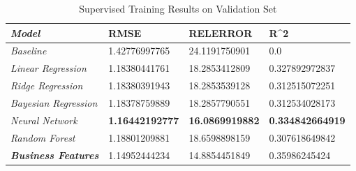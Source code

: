 \documentclass[letterpaper, 10 pt, conference]{ieeeconf}  %
\begin{document}

{\renewcommand{\arraystretch}{2}%
\begin{table}[t]
\centering
\caption{Supervised Training Results on Validation Set}
{}\label{table:validation_set_results}
\begin{tabular}{|l|lll}
\hline
\textit{\textbf{Model}}      & \multicolumn{1}{l|}{\textbf{RMSE}} & \multicolumn{1}{l|}{\textbf{RELERROR}} & \multicolumn{1}{l|}{\textbf{R\textasciicircum 2}} \\ \hline
\textit{Baseline}            & 1.42776997765                      & 24.1191750901                          & 0.0                                               \\ \cline{1-1}
\textit{Linear Regression}   & 1.18380441761                      & 18.2853412809                          & 0.327892972837                                    \\ \cline{1-1}
\textit{Ridge Regression}    & 1.18380391943                      & 18.2853539128                          & 0.312515072251                                    \\ \cline{1-1}
\textit{Bayesian Regression} & 1.18378759889                      & 18.2857790551                          & 0.312534028173                                    \\ \cline{1-1}
\textit{Neural Network}      & \textbf{1.16442192777}             & \textbf{16.0869919882}                 & \textbf{0.334842664919}                           \\ \cline{1-1}
\textit{Random Forest}       & 1.18801209881                      & 18.6598898159                          & 0.307618649842                                    \\ \cline{1-1}
\textit{\textbf{Business Features}}       & 1.14952444234            & 14.8854451849                 & 0.35986245424                           \\ \cline{1-1}
\end{tabular}
\end{table}
}
\end{document}
